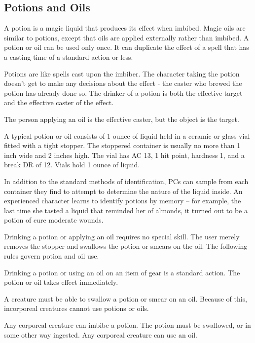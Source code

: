     \subsection{Potions and Oils}

        A potion is a magic liquid that produces its effect when imbibed.
        Magic oils are similar to potions, except that oils are applied externally rather than imbibed.
        A potion or oil can be used only once.
        It can duplicate the effect of a spell that has a casting time of a standard action or less.

        Potions are like spells cast upon the imbiber.
        The character taking the potion doesn't get to make any decisions about the effect  - the caster who brewed the potion has already done so.
        The drinker of a potion is both the effective target and the effective caster of the effect.

        The person applying an oil is the effective caster, but the object is the target.

         A typical potion or oil consists of 1 ounce of liquid held in a ceramic or glass vial fitted with a tight stopper.
        The stoppered container is usually no more than 1 inch wide and 2 inches high.
        The vial has AC 13, 1 hit point, hardness 1, and a break DR of 12.
        Vials hold 1 ounce of liquid.

         In addition to the standard methods of identification, PCs can sample from each container they find to attempt to determine the nature of the liquid inside.
        An experienced character learns to identify potions by memory -- for example, the last time she tasted a liquid that reminded her of almonds, it turned out to be a potion of cure moderate wounds.

         Drinking a potion or applying an oil requires no special skill.
        The user merely removes the stopper and swallows the potion or smears on the oil.
        The following rules govern potion and oil use.

        Drinking a potion or using an oil on an item of gear is a standard action.
        The potion or oil takes effect immediately.

        A creature must be able to swallow a potion or smear on an oil.
        Because of this, incorporeal creatures cannot use potions or oils.

        Any corporeal creature can imbibe a potion.
        The potion must be swallowed, or in some other way ingested.
        Any corporeal creature can use an oil.

